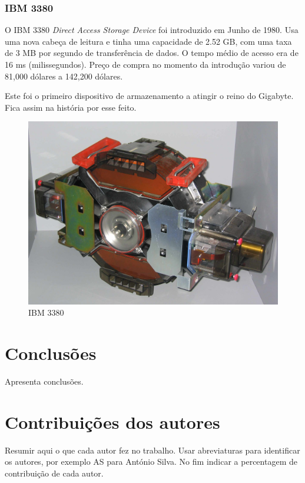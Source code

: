 \documentclass{report}
\begin{document}
\newpage		
		
		\subsection{IBM 3380}	
	O IBM 3380 \textit{Direct Access Storage Device}  foi introduzido em Junho de 1980. Usa uma nova cabeça de leitura e tinha uma capacidade de 2.52 GB, com uma taxa de 3 MB por segundo de transferência de dados. O tempo médio de acesso era de 16 ms (milissegundos). Preço de compra no momento da introdução variou de 81,000 dólares a 142,200 dólares.
\vspace{1mm}

	Este foi o primeiro dispositivo de armazenamento a atingir o reino do Gigabyte. Fica assim na história por esse feito.
\vspace{1mm}
		
		
	\begin{figure} [h]
		\centering
		\includegraphics[scale=0.07]{ibm3380.jpg}
		\caption{IBM 3380}
	\end{figure}
		

\chapter{Conclusões}
\label{chap.conclusao}
Apresenta conclusões.

\chapter*{Contribuições dos autores}
Resumir aqui o que cada autor fez no trabalho.
Usar abreviaturas para identificar os autores,
por exemplo AS para António Silva.
No fim indicar a percentagem de contribuição de cada autor.
\end{document}
